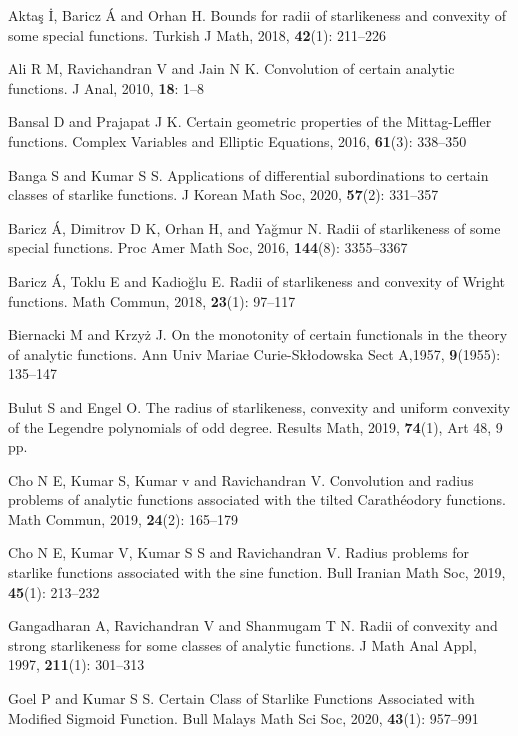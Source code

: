 \documentclass[12pt, reqno]{amsart}
\numberwithin{equation}{section}
\theoremstyle{plain}
\theoremstyle{definition}
\theoremstyle{remark}
\begin{document}
\begin{thebibliography}{99}
	\setlength{\itemsep}{5pt}

	 Akta\c{s} \.{I}, Baricz \'{A} and Orhan H. Bounds for radii of starlikeness and convexity of some special functions. Turkish J Math, 2018, {\bf 42}(1): 211--226

  Ali R M, Ravichandran V and Jain N K. Convolution of certain analytic functions. J Anal, 2010, {\bf 18}: 1--8

 Bansal D and  Prajapat J K. Certain geometric properties of the Mittag-Leffler functions. Complex Variables and Elliptic Equations, 2016, {\bf61}(3): 338--350

 Banga S and Kumar S S. Applications of differential subordinations to certain classes of starlike functions. J Korean Math Soc, 2020, {\bf57}(2): 331--357

Baricz \'{A}, Dimitrov D K, Orhan H, and Ya\u{g}mur N. Radii of starlikeness of some special functions. Proc Amer Math Soc, 2016, {\bf 144}(8): 3355--3367

Baricz \'{A}, Toklu E and Kadio\u{g}lu E. Radii of starlikeness and convexity of Wright functions. Math Commun, 2018, {\bf 23}(1): 97--117

 Biernacki M and Krzy\.{z} J. On the monotonity of certain functionals in the theory of analytic functions. Ann Univ Mariae Curie-Sk\l odowska Sect A,1957, {\bf 9}(1955): 135--147

 Bulut S and Engel O. The radius of starlikeness, convexity and uniform convexity of the Legendre polynomials of odd degree. Results Math, 2019, {\bf 74}(1), Art 48, 9 pp.

 Cho N E, Kumar S, Kumar v and Ravichandran V. Convolution and radius problems of analytic functions associated with the tilted Carath\'{e}odory functions. Math Commun, 2019, {\bf 24}(2): 165--179

  Cho N E, Kumar V,  Kumar S S and Ravichandran V. Radius problems for starlike functions associated with the sine function. Bull Iranian Math Soc, 2019, {\bf 45}(1): 213--232

 Gangadharan A, Ravichandran V and Shanmugam T N. Radii of convexity and strong starlikeness for some classes of analytic functions. J Math Anal Appl, 1997, {\bf 211}(1): 301--313

Goel P and Kumar S S. Certain Class of Starlike Functions Associated with Modified Sigmoid Function. Bull Malays Math Sci Soc, 2020, {\bf 43}(1): 957--991


\end{thebibliography}
\end{document}
